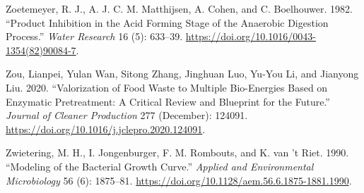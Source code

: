 \documentclass[11pt]{report}
\begin{document}
\begin{hangparas}{1.5em}{1}
\hypertarget{citeproc_bib_item_106}{Zoetemeyer, R. J., A. J. C. M. Matthijsen, A. Cohen, and C. Boelhouwer. 1982. “Product Inhibition in the Acid Forming Stage of the Anaerobic Digestion Process.” \textit{Water Research} 16 (5): 633–39. \url{https://doi.org/10.1016/0043-1354(82)90084-7}.}

\hypertarget{citeproc_bib_item_107}{Zou, Lianpei, Yulan Wan, Sitong Zhang, Jinghuan Luo, Yu-You Li, and Jianyong Liu. 2020. “Valorization of Food Waste to Multiple Bio-Energies Based on Enzymatic Pretreatment: A Critical Review and Blueprint for the Future.” \textit{Journal of Cleaner Production} 277 (December): 124091. \url{https://doi.org/10.1016/j.jclepro.2020.124091}.}

\hypertarget{citeproc_bib_item_108}{Zwietering, M. H., I. Jongenburger, F. M. Rombouts, and K. van ’t Riet. 1990. “Modeling of the Bacterial Growth Curve.” \textit{Applied and Environmental Microbiology} 56 (6): 1875–81. \url{https://doi.org/10.1128/aem.56.6.1875-1881.1990}.}\bigskip
\end{hangparas}
\end{document}
